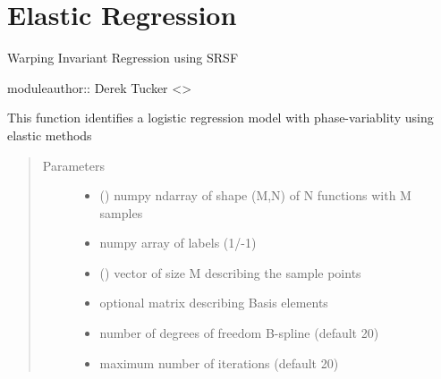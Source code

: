 \documentclass[letterpaper,10pt,english]{sphinxmanual}
\begin{document}
\chapter{Elastic Regression}
\label{\detokenize{regression:module-regression}}\label{\detokenize{regression:elastic-regression}}\label{\detokenize{regression::doc}}
Warping Invariant Regression using SRSF

moduleauthor:: Derek Tucker \textless{}\textgreater{}

\begin{fulllineitems}
\label{\detokenize{regression:regression.elastic_logistic}}
This function identifies a logistic regression model with
phase-variablity using elastic methods
\begin{quote}\begin{description}
\item[{Parameters}] \leavevmode\begin{itemize}
\item {} 
 () \textendash{} numpy ndarray of shape (M,N) of N functions with M samples

\item {} 
 \textendash{} numpy array of labels (1/-1)

\item {} 
 () \textendash{} vector of size M describing the sample points

\item {} 
 \textendash{} optional matrix describing Basis elements

\item {} 
 \textendash{} number of degrees of freedom B-spline (default 20)

\item {} 
 \textendash{} maximum number of iterations (default 20)


\end{itemize}
\end{description}
\end{quote}
\end{fulllineitems}
\end{document}
